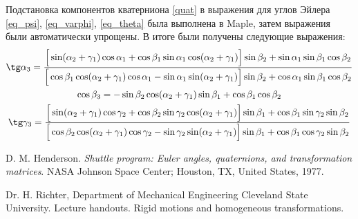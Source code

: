 \documentclass[14pt]{extarticle}
\begin{document}
Подстановка компонентов кватерниона \eqref{quat} в выражения для углов Эйлера \eqref{eq_psi}, \eqref{eq_varphi}, \eqref{eq_theta} была выполнена в Maple, затем выражения были автоматически упрощены. В итоге были получены следующие выражения:
\begin{gather}
	\tg \alpha_3 = \frac{\Big[ \sin (\alpha_2 + \gamma_1) \cos \alpha_1 + \cos \beta_1 \sin \alpha_1 \cos (\alpha_2 + \gamma_1) \Big] \sin \beta_2 + \sin \alpha_1 \sin \beta_1 \cos \beta_2}{\Big[ \cos \beta_1 \cos (\alpha_2 + \gamma_1) \cos \alpha_1 - \sin \alpha_1 \sin(\alpha_2 + \gamma_1) \Big] \sin \beta_2 + \cos \alpha_1 \sin \beta_1 \cos \beta_2} \\
	\cos \beta_3 = - \sin \beta_2 \cos (\alpha_2 + \gamma_1 ) \sin \beta_1 + \cos \beta_1 \cos \beta_2 \\
	\tg \gamma_3 = \frac{\Big[ \sin (\alpha_2 + \gamma_1) \cos \gamma_2 + \cos \beta_2 \sin \gamma_2 \cos (\alpha_2 + \gamma_1) \Big] \sin \beta_1 + \cos \beta_1 \sin \gamma_2 \sin \beta_2}{\Big[ \cos \beta_2 \cos (\alpha_2 + \gamma_1) \cos \gamma_2 - \sin \gamma_2 \sin (\alpha_2 + \gamma_1) \Big] \sin \beta_1 + \cos \beta_1 \cos \gamma_2 \sin \beta_2} 
\end{gather}

\begin{thebibliography}{1}
D. M. Henderson. \textit{Shuttle program: Euler angles, quaternions, and transformation matrices}.	NASA Johnson Space Center; Houston, TX, United States, 1977.

Dr. H. Richter, Department of Mechanical Engineering Cleveland State University. Lecture handouts. Rigid motions and homogeneous transformations.
\end{thebibliography}
\end{document}

